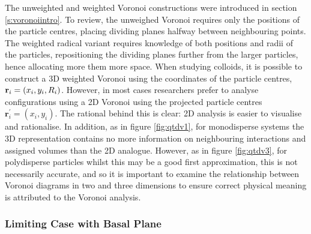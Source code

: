The unweighted and weighted Voronoi constructions were introduced in section \ref{s:voronoiintro}.
To review, the unweighed Voronoi requires only the positions of the particle centres, placing dividing planes halfway between neighbouring points.
The weighted radical variant requires knowledge of both positions and radii of the particles, repositioning the dividing planes further from the larger particles, hence allocating more them more space.
When studying \qtd{} colloids, it is possible to construct a 3D weighted Voronoi using the coordinates of the particle centres, $\mathbf{r}_i=\left(x_i,y_i,R_i\right)$.
However, in most cases researchers prefer to analyse configurations using a 2D Voronoi using the projected particle centres $\mathbf{r}_i^\prime=\left(x_i,y_i\right)$. 
The rational behind this is clear: 2D analysis is easier to visualise and rationalise.
In addition, as in figure \ref{fig:qtdv1}, for monodisperse systems the 3D representation contains no more information on neighbouring interactions and assigned volumes than the 2D analogue.
However, as in figure \ref{fig:qtdv3}, for polydisperse particles whilst this may be a good first approximation, this is not necessarily accurate, and so it is important to examine the relationship between Voronoi diagrams in two and three dimensions to ensure correct physical meaning is attributed to the Voronoi analysis.

\subsubsection{Limiting Case with Basal Plane}

